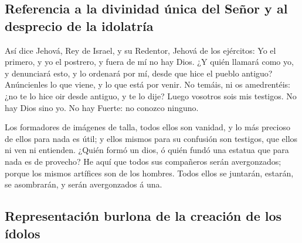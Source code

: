 \hypertarget{referencia-a-la-divinidad-uxfanica-del-seuxf1or-y-al-desprecio-de-la-idolatruxeda}{%
\subsection{Referencia a la divinidad única del Señor y al desprecio de
la
idolatría}\label{referencia-a-la-divinidad-uxfanica-del-seuxf1or-y-al-desprecio-de-la-idolatruxeda}}

 Así dice Jehová, Rey de Israel, y su Redentor, Jehová de
los ejércitos: Yo el primero, y yo el postrero, y fuera de mí no hay
Dios.  ¿Y quién llamará como yo, y denunciará esto, y lo
ordenará por mí, desde que hice el pueblo antiguo? Anúncienles lo que
viene, y lo que está por venir.  No temáis, ni os
amedrentéis: ¿no te lo hice oir desde antiguo, y te lo dije? Luego
vosotros sois mis testigos. No hay Dios sino yo. No hay Fuerte: no
conozco ninguno.

 Los formadores de imágenes de talla, todos ellos son
vanidad, y lo más precioso de ellos para nada es útil; y ellos mismos
para su confusión son testigos, que ellos ni ven ni entienden.
 ¿Quién formó un dios, ó quién fundó una estatua que para
nada es de provecho?  He aquí que todos sus compañeros
serán avergonzados; porque los mismos artífices son de los hombres.
Todos ellos se juntarán, estarán, se asombrarán, y serán avergonzados á
una.

\hypertarget{representaciuxf3n-burlona-de-la-creaciuxf3n-de-los-uxeddolos}{%
\subsection{Representación burlona de la creación de los
ídolos}\label{representaciuxf3n-burlona-de-la-creaciuxf3n-de-los-uxeddolos}}

